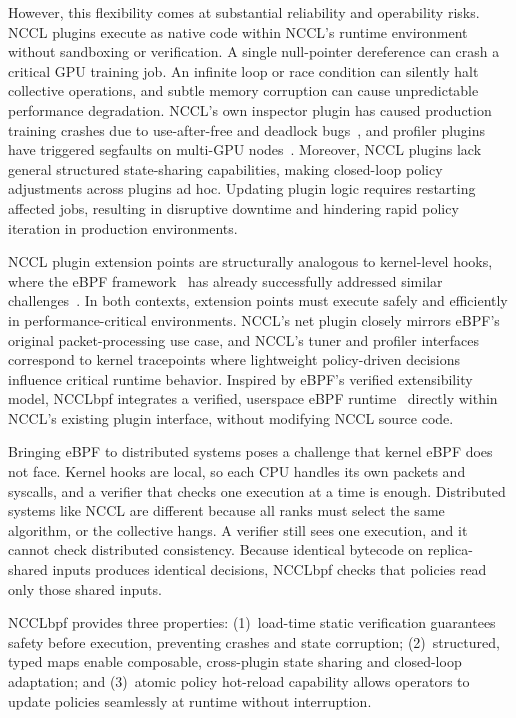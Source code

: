 \documentclass[sigplan,10pt]{acmart}
\newcommand{\sysname}{NCCLbpf\xspace}
\begin{document}
However, this flexibility comes at substantial reliability and
operability risks. NCCL plugins execute as native code within
NCCL's runtime environment without sandboxing or verification. A
single null-pointer dereference can crash a critical GPU training
job. An infinite loop or race condition can silently halt collective
operations, and subtle memory corruption can cause unpredictable
performance degradation. NCCL's own inspector
plugin has caused production training crashes due to use-after-free
and deadlock bugs~\cite{nccl-inspector-bug}, and profiler plugins
have triggered segfaults on multi-GPU
nodes~\cite{nccl-profiler-bug}. Moreover, NCCL plugins lack general
structured state-sharing capabilities, making closed-loop policy
adjustments across plugins ad hoc. Updating plugin logic
requires restarting affected jobs, resulting in disruptive downtime
and hindering rapid policy iteration in production environments.

NCCL plugin extension points are structurally analogous to kernel-level
hooks, where the eBPF
framework~\cite{ebpf-linux} has already successfully addressed
similar challenges~\cite{xrp, electrode, pageflex}. In both
contexts, extension points must execute safely and efficiently in
performance-critical environments. NCCL's net plugin closely
mirrors eBPF's original packet-processing use case, and NCCL's
tuner and profiler interfaces correspond to kernel tracepoints
where lightweight policy-driven decisions influence critical runtime
behavior. Inspired by eBPF's verified extensibility model,
\sysname integrates a verified, userspace eBPF
runtime~\cite{bpftime} directly within NCCL's existing plugin
interface, without modifying NCCL source code.

Bringing eBPF to distributed systems poses a challenge that kernel
eBPF does not face. Kernel hooks are local, so each CPU handles its own
packets and syscalls, and a verifier that checks one execution at
a time is enough. Distributed systems like NCCL are different because all
ranks must select the same algorithm, or the collective hangs. A
verifier still sees one execution, and it cannot check distributed
consistency. Because identical bytecode on replica-shared inputs
produces identical decisions, \sysname{} checks that policies read only
those shared inputs.

\sysname provides three properties: (1)~load-time static
verification guarantees safety before execution, preventing crashes
and state corruption; (2)~structured, typed maps enable composable,
cross-plugin state sharing and closed-loop adaptation; and (3)~atomic policy hot-reload
capability allows operators to update policies seamlessly at
runtime without interruption.
\end{document}
